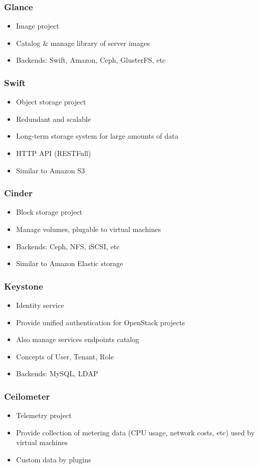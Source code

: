 \begin{frame}
	\frametitle{Glance}
	\begin{itemize}
		\item Image project
		\item Catalog \& manage library of server images
		\item Backends: Swift, Amazon, Ceph, GlusterFS, etc
	\end{itemize}
\end{frame}

\begin{frame}
	\frametitle{Swift}
	\begin{itemize}
		\item Object storage project
		\item Redundant and scalable
		\item Long-term storage system for large amounts of data
		\item HTTP API (RESTFull)
		\item Similar to Amazon S3
	\end{itemize}
\end{frame}

\begin{frame}
	\frametitle{Cinder}
	\begin{itemize}
		\item Block storage project
		\item Manage volumes, plugable to virtual machines
		\item Backends: Ceph, NFS, iSCSI, etc
		\item Similar to Amazon Elastic storage
	\end{itemize}
\end{frame}

\begin{frame}
	\frametitle{Keystone}
	\begin{itemize}
		\item Identity service
		\item Provide unified authentication for OpenStack projects
		\item Also manage services endpoints catalog
		\item Concepts of User, Tenant, Role
		\item Backends: MySQL, LDAP
	\end{itemize}
\end{frame}

\begin{frame}
	\frametitle{Ceilometer}
	\begin{itemize}
		\item Telemetry project
		\item Provide collection of metering data (CPU
			  usage, network costs, etc) used by virtual
              machines
		\item Custom data by plugins
	\end{itemize}
\end{frame}

